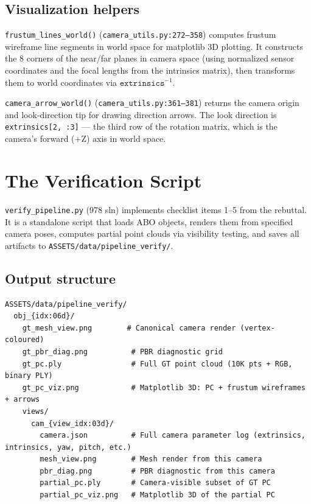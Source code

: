 \subsection{Visualization helpers}

\texttt{frustum\_lines\_world()} (\texttt{camera\_utils.py:272--358})
computes frustum wireframe line segments in world space for matplotlib 3D
plotting. It constructs the 8 corners of the near/far planes in camera
space (using normalized sensor coordinates and the focal lengths from the
intrinsics matrix), then transforms them to world coordinates via
$\texttt{extrinsics}^{-1}$.

\texttt{camera\_arrow\_world()} (\texttt{camera\_utils.py:361--381})
returns the camera origin and look-direction tip for drawing direction
arrows. The look direction is \texttt{extrinsics[2, :3]} --- the third row
of the rotation matrix, which is the camera's forward (+Z) axis in world
space.

\section{The Verification Script}

\texttt{verify\_pipeline.py} (978 sln) implements
checklist items 1--5 from the rebuttal. It is a standalone script that
loads ABO objects, renders them from specified camera poses, computes
partial point clouds via visibility testing, and saves all artifacts to
\texttt{ASSETS/data/pipeline\_verify/}.

\subsection{Output structure}

\begin{lstlisting}
ASSETS/data/pipeline_verify/
  obj_{idx:06d}/
    gt_mesh_view.png        # Canonical camera render (vertex-coloured)
    gt_pbr_diag.png          # PBR diagnostic grid
    gt_pc.ply                # Full GT point cloud (10K pts + RGB, binary PLY)
    gt_pc_viz.png            # Matplotlib 3D: PC + frustum wireframes + arrows
    views/
      cam_{view_idx:03d}/
        camera.json          # Full camera parameter log (extrinsics, intrinsics, yaw, pitch, etc.)
        mesh_view.png        # Mesh render from this camera
        pbr_diag.png         # PBR diagnostic from this camera
        partial_pc.ply       # Camera-visible subset of GT PC
        partial_pc_viz.png   # Matplotlib 3D of the partial PC
\end{lstlisting}

